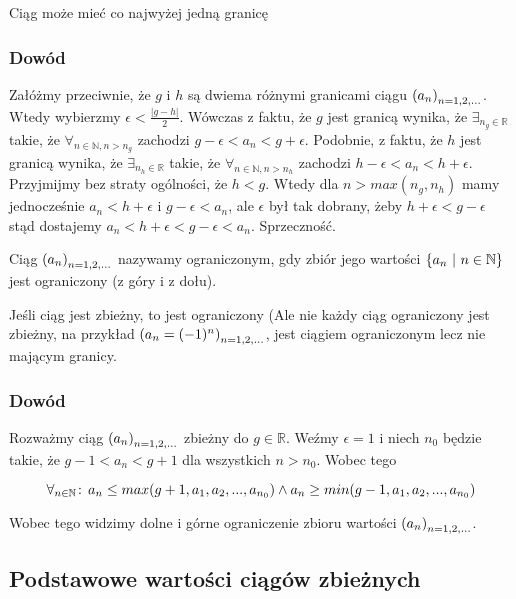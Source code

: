\documentclass[9pt]{article}
\begin{document}
\begin{Twi}
    Ciąg może mieć co najwyżej jedną granicę
\end{Twi}

\subsubsection*{Dowód}

Załóżmy przeciwnie, że $g$ i $h$ są dwiema różnymi granicami ciągu $\left(a_n\right)_{n = 1,2,...}$. Wtedy wybierzmy
$\epsilon < \frac{|g-h|}{2}$. Wówczas z faktu, że $g$ jest granicą wynika, że $\exists_{n_g \in
\mathbb{R}}$ takie, że $\forall_{n \in \mathbb{N}, n > n_g}$ zachodzi $g-\epsilon < a_n < g +
\epsilon$. Podobnie, z faktu, że $h$ jest granicą wynika, że $\exists_{n_h \in \mathbb{R}}$ takie,
że $\forall_{n \in \mathbb{N}, n > n_h}$ zachodzi $h - \epsilon < a_n < h + \epsilon$. Przyjmijmy
bez straty ogólności, że $h < g$. Wtedy dla $n > max (n_g, n_h)$ mamy jednocześnie $a_n < h +
\epsilon$ i $g - \epsilon < a_n$, ale $\epsilon$ był tak dobrany, żeby $h+\epsilon < g-\epsilon$
stąd dostajemy $a_n < h + \epsilon < g-\epsilon < a_n$. Sprzeczność.

\begin{Def}
    Ciąg $\left(a_n\right)_{n = 1,2,...}$ nazywamy ograniczonym, gdy zbiór jego wartości $\{a_n\ |\  n \in \mathbb{N}\}$ jest
    ograniczony (z góry i z dołu).
\end{Def}

\begin{Twi}
    Jeśli ciąg jest zbieżny, to jest ograniczony (Ale nie każdy ciąg ograniczony jest zbieżny, na
    przykład $\left(a_n = (-1)^n\right)_{n = 1,2,...}$, jest ciągiem ograniczonym lecz nie mającym granicy.
\end{Twi}

\subsubsection*{Dowód}

Rozważmy ciąg $\left(a_n\right)_{n = 1,2,...}$ zbieżny do $g \in \mathbb{R}$. Weźmy $\epsilon = 1$ i niech $n_0$ będzie
takie, że $g-1 < a_n < g+1$ dla wszystkich $n > n_0$. Wobec tego

\[
    \forall_{n \in \mathbb{N}} \! : \, a_n \le max(g+1, a_1, a_2, ..., a_{n_0}) \land a_n \ge min (g-1,
    a_1, a_2, ..., a_{n_0})
\]

Wobec tego widzimy dolne i górne ograniczenie zbioru wartości $\left(a_n\right)_{n = 1,2,...}$.

\subsection{Podstawowe wartości ciągów zbieżnych}
\end{document}
